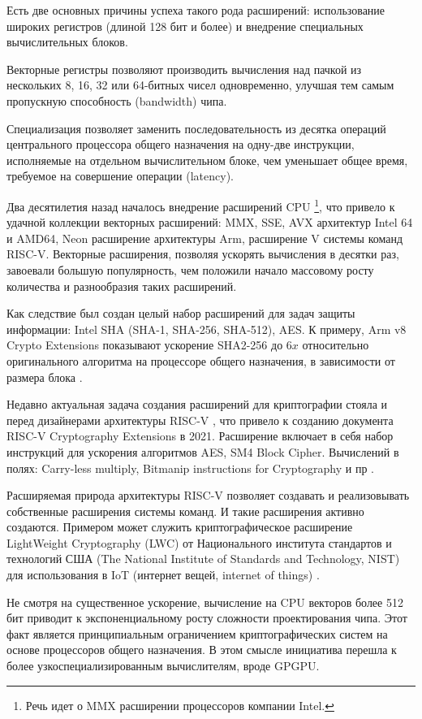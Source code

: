 \documentclass[a4paper,12pt]{article}
\begin{document}
Есть две основных причины успеха такого рода расширений: использование широких регистров (длиной 128 бит и более) и внедрение специальных вычислительных блоков. 

Векторные регистры позволяют производить вычисления над пачкой из нескольких 8, 16, 32 или 64-битных чисел одновременно, улучшая тем самым пропускную способность (bandwidth) чипа.

Специализация позволяет заменить последовательность из десятка операций центрального процессора общего назначения на одну-две инструкции, исполняемые на отдельном вычислительном блоке, чем уменьшает общее время, требуемое на совершение операции (latency).  

Два десятилетия назад началось внедрение расширений CPU \footnote{Речь идет о MMX расширении процессоров компании Intel.}, что привело к удачной коллекции векторных расширений: MMX, SSE, AVX архитектур Intel 64 и AMD64, Neon расширение архитектуры Arm, расширение V системы команд RISC-V. Векторные расширения, позволяя ускорять вычисления в десятки раз, завоевали большую популярность, чем положили начало массовому росту количества и разнообразия таких расширений.

Как следствие был создан целый набор расширений для задач защиты информации: Intel SHA (SHA-1, SHA-256, SHA-512), AES. К примеру, Arm v8 Crypto Extensions показывают ускорение SHA2-256 до $6x$ относительно оригинального алгоритма на процессоре общего назначения, в зависимости от размера блока \cite{AMD_VASoC}.

Недавно актуальная задача создания расширений для криптографии стояла и перед дизайнерами архитектуры RISC-V \cite{RISCV_AES}, что привело к созданию документа RISC-V Cryptography Extensions в 2021. Расширение включает в себя набор инструкций для ускорения алгоритмов AES, SM4 Block Cipher. Вычислений в полях: Carry-less multiply, Bitmanip instructions for Cryptography и пр \cite{RISCV_CRYPTO}. 

Расширяемая природа архитектуры RISC-V позволяет создавать и реализовывать собственные расширения системы команд.  И такие расширения активно создаются. Примером может служить криптографическое расширение LightWeight
Cryptography (LWC) от Национального института стандартов и технологий США (The National Institute of Standards and Technology, NIST) для использования в IoT (интернет вещей, internet of things) \cite{RISCV_IoT}.

Не смотря на существенное ускорение, вычисление на CPU векторов более 512 бит приводит к экспоненциальному росту сложности проектирования чипа. Этот факт является принципиальным ограничением криптографических систем на основе процессоров общего назначения. В этом смысле инициатива перешла к более узкоспециализированным вычислителям, вроде GPGPU.
\end{document}
